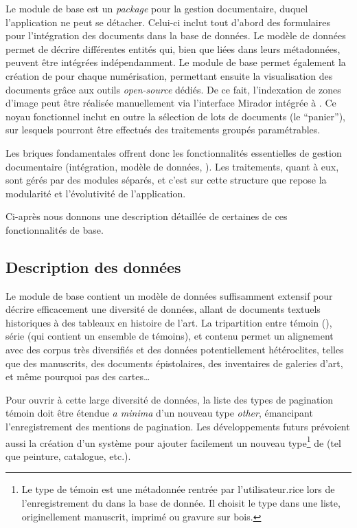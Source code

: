 Le module de base est un \textit{package} pour la gestion documentaire, duquel
l'application ne peut se détacher. Celui-ci inclut tout d'abord des
formulaires pour l'intégration des documents dans la base de données. Le
modèle de données permet de décrire différentes entités qui, bien que
liées dans leurs métadonnées, peuvent être intégrées indépendamment. Le
module de base permet également la création de \mans \iiif pour
chaque numérisation, permettant ensuite la visualisation des documents
grâce aux outils \textit{open-source} dédiés. De ce fait, l'indexation de zones
d'image peut être réalisée manuellement via l'interface Mirador intégrée
à \sas. Ce noyau fonctionnel inclut en outre la sélection de lots de
documents (le \enquote{panier}), sur lesquels pourront être effectués des
traitements groupés paramétrables.

Les briques fondamentales offrent donc les fonctionnalités essentielles
de gestion documentaire (intégration, modèle de données, \iiif). Les
traitements, quant à eux, sont gérés par des modules séparés, et c'est
sur cette structure que repose la modularité et l'évolutivité de
l'application.

Ci-après nous donnons une description détaillée de certaines de ces
fonctionnalités de base.

\hypertarget{description-des-donnees}{%
\subsection{Description des
données}\label{description-des-donnees}}

Le module de base contient un modèle de données suffisamment extensif
pour décrire efficacement une diversité de données, allant de documents
textuels historiques à des tableaux en histoire de l'art. La
tripartition entre témoin (\wit), série (qui contient un ensemble de
témoins), et contenu permet un alignement avec des corpus très
diversifiés et des données potentiellement hétéroclites, telles que des
manuscrits, des documents épistolaires, des inventaires de galeries
d'art, et même pourquoi pas des cartes\ldots{}

Pour ouvrir à cette large diversité de données, la liste des types de
pagination témoin doit être étendue \emph{a minima} d'un nouveau type
\textit{other}, émancipant l'enregistrement des mentions de pagination. Les
développements futurs prévoient aussi la création d'un système pour
ajouter facilement un nouveau type\footnote{Le type de témoin est une
  métadonnée rentrée par l'utilisateur.rice lors de l'enregistrement du
  \wit dans la base de donnée. Il choisit le type dans une liste,
  originellement manuscrit, imprimé ou gravure sur bois.} de \wit
(tel que peinture, catalogue, etc.).

